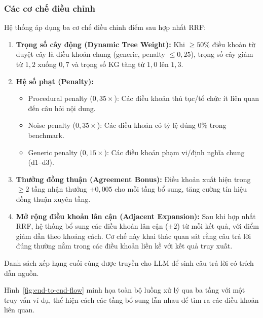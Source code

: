 \subsubsection{Các cơ chế điều chỉnh}
\label{subsubsec:dieu-chinh}

Hệ thống áp dụng ba cơ chế điều chỉnh điểm sau hợp nhất RRF:

\begin{enumerate}
  \item \textbf{Trọng số cây động (Dynamic Tree Weight):} Khi $\geq 50\%$ điều
        khoản từ duyệt cây là điều khoản chung (generic, penalty $\leq 0{,}25$),
        trọng số cây giảm từ $1{,}2$ xuống $0{,}7$ và trọng số KG tăng từ $1{,}0$
        lên $1{,}3$.

  \item \textbf{Hệ số phạt (Penalty):}
        \begin{itemize}
          \item Procedural penalty ($0{,}35\times$): Các điều khoản thủ tục/tổ
                chức ít liên quan đến câu hỏi nội dung.
          \item Noise penalty ($0{,}35\times$): Các điều khoản có tỷ lệ đúng 0\%
                trong benchmark.
          \item Generic penalty ($0{,}15\times$): Các điều khoản phạm vi/định
                nghĩa chung (d1--d3).
        \end{itemize}

  \item \textbf{Thưởng đồng thuận (Agreement Bonus):} Điều khoản xuất hiện trong
        $\geq 2$ tầng nhận thưởng $+0{,}005$ cho mỗi tầng bổ sung, tăng cường tín
        hiệu đồng thuận xuyên tầng.

  \item \textbf{Mở rộng điều khoản lân cận (Adjacent Expansion):} Sau khi hợp nhất
        RRF, hệ thống bổ sung các điều khoản lân cận ($\pm 2$) từ mỗi kết quả, với
        điểm giảm dần theo khoảng cách. Cơ chế này khai thác quan sát rằng câu trả
        lời đúng thường nằm trong các điều khoản liền kề với kết quả truy xuất.
\end{enumerate}

Danh sách xếp hạng cuối cùng được truyền cho LLM để sinh câu trả lời có trích dẫn
nguồn.

Hình~\ref{fig:end-to-end-flow} minh họa toàn bộ luồng xử lý qua ba tầng với một
truy vấn ví dụ, thể hiện cách các tầng bổ sung lẫn nhau để tìm ra các điều khoản
liên quan.
